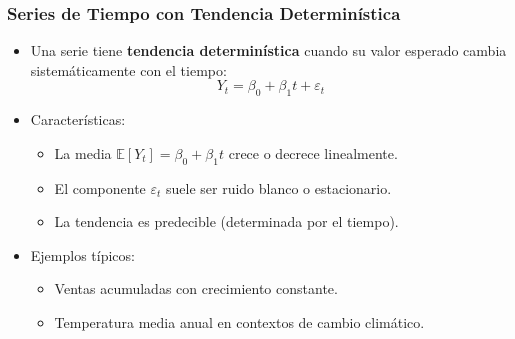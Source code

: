 \documentclass{beamer}
\begin{document}
\begin{frame}
\frametitle{Series de Tiempo con Tendencia Determinística}
\begin{itemize}
    \item Una serie tiene \textbf{tendencia determinística} cuando su valor esperado cambia sistemáticamente con el tiempo:
    \[
    Y_t = \beta_0 + \beta_1 t + \varepsilon_t
    \]
    \item Características:
    \begin{itemize}
        \item La media \(\mathbb{E}[Y_t] = \beta_0 + \beta_1 t\) crece o decrece linealmente.
        \item El componente \(\varepsilon_t\) suele ser ruido blanco o estacionario.
        \item La tendencia es predecible (determinada por el tiempo).
    \end{itemize}
    \item Ejemplos típicos:
    \begin{itemize}
        \item Ventas acumuladas con crecimiento constante.
        \item Temperatura media anual en contextos de cambio climático.
    \end{itemize}
   
\end{itemize}
\end{frame}
\end{document}
